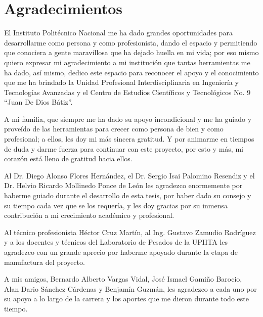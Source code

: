 \chapter*{Agradecimientos}
	
	\vspace*{5mm}
	
	El Instituto Politécnico Nacional me ha dado grandes oportunidades para desarrollarme como persona y como profesionista, dando el espacio y permitiendo que conociera a gente maravillosa que ha dejado huella en mi vida; por eso mismo quiero expresar mi agradecimiento a mi institución que tantas herramientas me ha dado, así mismo, dedico este espacio para reconocer el apoyo y el conocimiento que me ha brindado la Unidad Profesional Interdisciplinaria en Ingeniería y Tecnologías Avanzadas y el Centro de Estudios Científicos y Tecnológicos No. 9 ``Juan De Dios Bátiz''.
	
	A mi familia, que siempre me ha dado su apoyo incondicional y me ha guiado y proveído de las herramientas para crecer como persona de bien y como profesional; a ellos, les doy mi más sincera gratitud. Y por animarme en tiempos de duda y darme fuerza para continuar con este proyecto, por esto y más, mi corazón está lleno de gratitud hacia ellos.
	
	Al Dr. Diego Alonso Flores Hernández, el Dr. Sergio Isai Palomino Resendiz y el Dr. Helvio Ricardo Mollinedo Ponce de León les agradezco enormemente por haberme guiado durante el desarrollo de esta tesis, por haber dado su consejo y su tiempo cada vez que se los requería, y les doy gracias por su inmensa contribución a mi crecimiento académico y profesional.
	
	Al técnico profesionista Héctor Cruz Martín, al Ing. Gustavo Zamudio Rodríguez y a los docentes y técnicos del Laboratorio de Pesados de la UPIITA les agradezco con un grande aprecio por haberme apoyado durante la etapa de manufactura del proyecto.
	
	A mis amigos, Bernardo Alberto Vargas Vidal, José Ismael Gamiño Barocio, Alan Dario Sánchez Cárdenas y Benjamín Guzmán, les agradezco a cada uno por su apoyo a lo largo de la carrera y los aportes que me dieron durante todo este tiempo.
